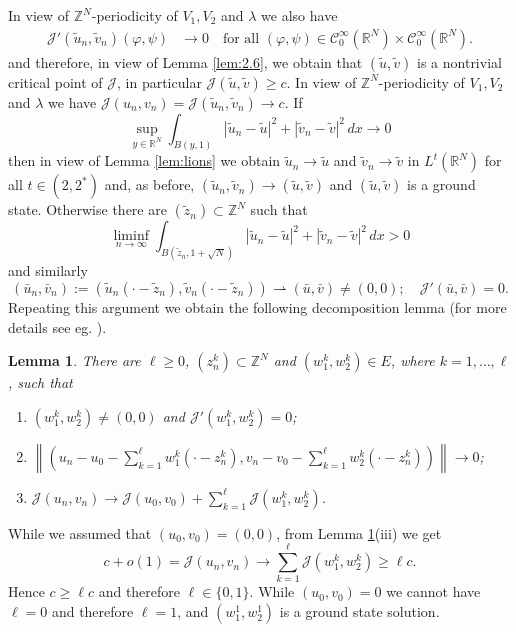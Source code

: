 \documentclass{scrartcl}
\newtheorem{Lem}[Th]{Lemma}
\newcommand{\cC}{{\mathcal C}}
\newcommand{\cJ}{{\mathcal J}}
\newcommand{\R}{\mathbb{R}}
\newcommand{\Z}{\mathbb{Z}}
\newcommand{\weakto}{\rightharpoonup}
\numberwithin{equation}{section}
\begin{document}
In view of $\mathbb{Z}^N$-periodicity of $V_1, V_2$ and $\lambda$ we also have 
\begin{align*}
\cJ'(\tilde{u}_n, \tilde{v}_n) (\varphi, \psi) &\to 0 \quad \mbox{for all } (\varphi, \psi) \in \cC_0^\infty (\R^N) \times \cC_0^\infty (\R^N).
\end{align*}
and therefore, in view of Lemma \ref{lem:2.6}, we obtain that $(\tilde{u}, \tilde{v})$ is a nontrivial critical point of $\cJ$, in particular $\cJ(\tilde{u},\tilde{v}) \geq c$. In view of $\mathbb{Z}^N$-periodicity of $V_1, V_2$ and $\lambda$ we have $\cJ(u_n, v_n) = \cJ(\tilde{u}_n, \tilde{v}_n) \to c$. If
$$
\sup_{y \in \R^N} \int_{B(y,1)} |\tilde{u}_n - \tilde{u}|^2 +  |\tilde{v}_n - \tilde{v}|^2 \, dx \to 0
$$
then in view of Lemma \ref{lem:lions} we obtain $\tilde{u}_n \to \tilde{u}$ and $\tilde{v}_n \to \tilde{v}$ in $L^t (\R^N)$ for all $t \in (2,2^*)$ and, as before, $(\tilde{u}_n, \tilde{v}_n) \to (\tilde{u}, \tilde{v})$ and $(\tilde{u}, \tilde{v})$ is a ground state. Otherwise there are $(\tilde{z}_n) \subset \Z^N$ such that
$$
\liminf_{n\to\infty} \int_{B(\tilde{z}_n, 1+\sqrt{N})} |\tilde{u}_n - \tilde{u}|^2 +  |\tilde{v}_n - \tilde{v}|^2 \, dx > 0
$$
and similarly
$$
(\bar{u}_n, \bar{v}_n) := (\tilde{u}_n (\cdot - \tilde{z}_n), \tilde{v}_n (\cdot - \tilde{z}_n)) \weakto (\bar{u},\bar{v}) \neq (0,0); \quad \cJ'(\bar{u},\bar{v}) = 0.
$$
Repeating this argument we obtain the following decomposition lemma (for more details see eg. \cite[Theorem 4.1]{BieganowskiMederski}).

\begin{Lem}\label{decomp}
There are $\ell \geq 0$, $(z_n^k) \subset \Z^N$ and $(w_1^k, w_2^k) \in E$, where $k = 1, \ldots, \ell$, such that
\begin{enumerate}
\item[(i)] $(w_1^k, w_2^k) \neq (0,0)$ and $\cJ' (w_1^k, w_2^k) = 0$;
\item[(ii)] $\left\| \left( u_n - u_0 - \sum_{k=1}^\ell w_1^k (\cdot - z_n^k), v_n - v_0 - \sum_{k=1}^\ell w_2^k (\cdot - z_n^k) \right) \right\| \to 0$;
\item[(iii)] $\cJ (u_n, v_n) \to \cJ(u_0,v_0) + \sum_{k=1}^\ell \cJ (w_1^k, w_2^k)$.
\end{enumerate}
\end{Lem}

While we assumed that $(u_0,v_0) = (0,0)$, from Lemma \ref{decomp}(iii) we get
$$
c + o(1) = \cJ(u_n, v_n) \to \sum_{k=1}^\ell \cJ (w_1^k, w_2^k) \geq \ell c.
$$
Hence $c \geq \ell c$ and therefore $\ell \in \{0,1\}$. While $(u_0,v_0) = 0$ we cannot have $\ell = 0$ and therefore $\ell = 1$, and $(w_1^1, w_2^1)$ is a ground state solution.
\end{document}
